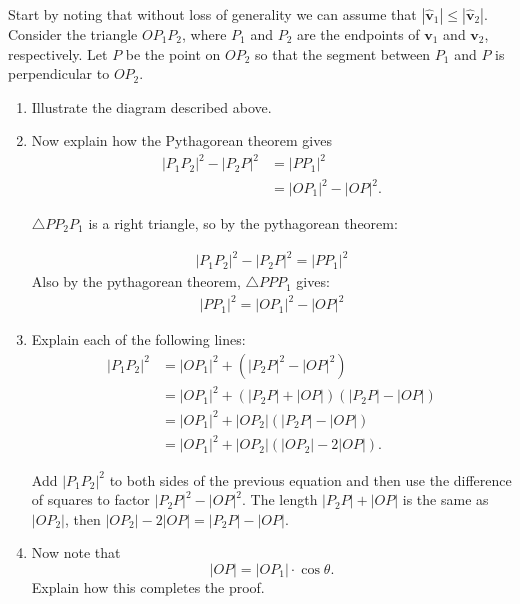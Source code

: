 \documentclass[newpage,hints,handout]{ximera}
\begin{document}
\begin{problem}
Start by noting that without loss of generality we can assume that
$\left\lvert \hat{\mathbf v} _{1}\right\rvert
\le \left\vert \hat{\mathbf v}_{2}\right\rvert$.
Consider the triangle $OP_1P_2$, where $P_1$ and $P_2$ are the endpoints of
$\mathbf{v}_1$ and $\mathbf{v}_2$, respectively.  Let $P$ be the point on
$OP_2$ so that the segment between $P_{1}$ and $P$ is perpendicular to $OP_2$.
\begin{enumerate}
\item Illustrate the diagram described above.


\item Now explain how the Pythagorean theorem gives
\begin{align*}
|P_{1}P_{2}|^{2}-|P_{2}P|^{2} &= |PP_{1}|^{2}\\
&= |OP_{1}|^{2}-|OP|^{2}.
\end{align*}

\begin{freeResponse}
$\triangle PP_{2}P_{1}$ is a right triangle, so by the pythagorean theorem:

\begin{align*}
|P_{1}P_{2}|^{2} - |P_{2}P|^{2} = |PP_{1}|^{2}
\end{align*}
Also by the pythagorean theorem, $ \triangle PPP_{1}$ gives:
\begin{align*}  |PP_{1}|^{2} = |OP_{1}|^{2} - |OP|^{2}
\end{align*}

\end{freeResponse}

\item Explain each of the following lines:
\begin{align}
|P_{1}P_{2}|^{2} &= |OP_{1}|^{2}+\left(|P_{2}P|^{2}-|OP|^{2}\right) \\
&=|OP_{1}|^{2}+\left(|P_{2}P|+|OP|\right)\left(|P_{2}P|-|OP| \right) \\
&=|OP_{1}|^{2}+|OP_{2}| \left(|P_{2}P|-|OP|\right)\\
&=|OP_{1}|^{2}+|OP_{2}| \left(|OP_{2}| -2| OP| \right).
\end{align}

\begin{freeResponse}
Add $|P_{1}P_{2}|^2$ to both sides of the previous equation and then use the difference of squares to factor $|P_{2}P|^{2}- |OP|^2$.
The length $|P_{2}P|+|OP|$ is the same as $|OP_{2}|$, then $|OP_{2}| - 2|OP| = |P_{2}P|-|OP|$.
\end{freeResponse}
\item Now note that
\[
|OP| =|OP_{1}| \cdot\cos\theta.
\]
Explain how this completes the proof.


\end{enumerate}
\end{problem}
\end{document}
